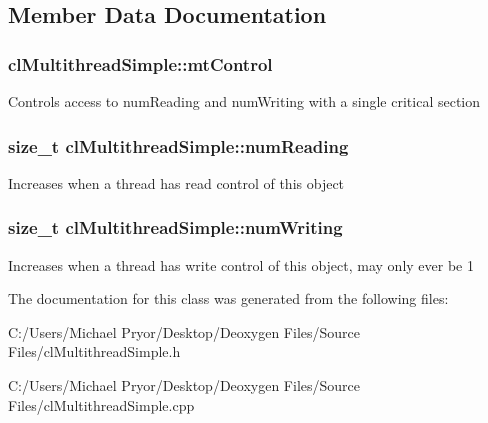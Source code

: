 \subsection{Member Data Documentation}
\hypertarget{classcl_multithread_simple_ae9cb27fad96cbc3db55ac86165e1187b}{
\subsubsection[{mtControl}]{ {\bf clMultithreadSimple::mtControl}}}
\label{classcl_multithread_simple_ae9cb27fad96cbc3db55ac86165e1187b}
Controls access to numReading and numWriting with a single critical section \hypertarget{classcl_multithread_simple_ad2ab35e527c9e1ac6e249aee7639d63c}{
\subsubsection[{numReading}]{\setlength{\rightskip}{0pt plus 5cm}size\_\-t {\bf clMultithreadSimple::numReading}}}
\label{classcl_multithread_simple_ad2ab35e527c9e1ac6e249aee7639d63c}
Increases when a thread has read control of this object \hypertarget{classcl_multithread_simple_aafa989579bab418fb86ff16ad4bc7db3}{
\subsubsection[{numWriting}]{\setlength{\rightskip}{0pt plus 5cm}size\_\-t {\bf clMultithreadSimple::numWriting}}}
\label{classcl_multithread_simple_aafa989579bab418fb86ff16ad4bc7db3}
Increases when a thread has write control of this object, may only ever be 1 

The documentation for this class was generated from the following files:\begin{DoxyCompactItemize}
\item 
C:/Users/Michael Pryor/Desktop/Deoxygen Files/Source Files/clMultithreadSimple.h\item 
C:/Users/Michael Pryor/Desktop/Deoxygen Files/Source Files/clMultithreadSimple.cpp\end{DoxyCompactItemize}
